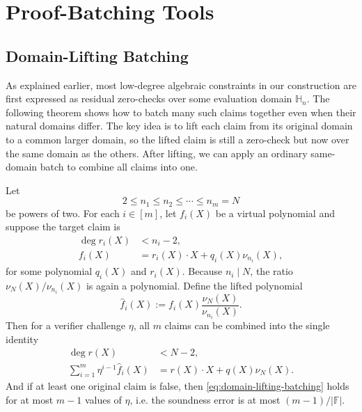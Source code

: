 \section{Proof-Batching Tools}\label{sec:tools}


\subsection{Domain-Lifting Batching}\label{app:domain-lifting-batch}

As explained earlier, most low-degree algebraic constraints in our construction
are first expressed as residual zero-checks over some evaluation domain
$\mathbb{H}_n$. The
following theorem shows how to batch many such claims together even when their
natural domains differ. The key idea is to lift each claim from its original
domain to a common larger domain, so the lifted claim is still a zero-check
but now over the same domain as the others. After lifting, we can apply an
ordinary same-domain batch to combine all claims into one.

\begin{theorem}
\label{thm:domain-lifting-batching}
Let
\[
2 \leq n_1 \leq n_2 \leq \cdots \leq n_m = N
\]
be powers of two. For each $i \in [m]$, let $f_i(X)$ be a virtual polynomial
and suppose the target claim is
\begin{align}
\deg r_i(X) &< n_i-2,\\
f_i(X) &= r_i(X)\cdot X + q_i(X)\nu_{n_i}(X),
\end{align}
for some polynomial $q_i(X)$ and $r_i(X)$.
Because $n_i \mid N$, the ratio $\nu_N(X)/\nu_{n_i}(X)$ is again a polynomial.
Define the lifted polynomial
\[
\widehat{f}_i(X):=
f_i(X)\frac{\nu_N(X)}{\nu_{n_i}(X)}.
\]
Then for a verifier challenge $\eta$, all $m$ claims can be combined into
  the single identity
  \begin{align}\label{eq:domain-lifting-batching}
    \deg r(X) &< N-2,\\
    \sum_{i=1}^{m}\eta^{i-1}\widehat{f}_i(X) &= r(X)\cdot X + q(X)\nu_N(X).
  \end{align}
  And if at least one original claim is false, then
  \eqref{eq:domain-lifting-batching} holds for at most $m-1$ values of $\eta$, i.e. the soundness error is at most $(m-1)/|\mathbb{F}|$.
\end{theorem}

